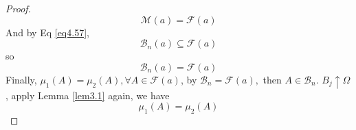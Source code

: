 \begin{proof}
\begin{equation}
   \mathcal{M}\left( a \right) = \mathcal{F}\left( a \right)
   \label{eq4.63}
   \end{equation}
   And by Eq \ref{eq4.57},
   \begin{equation}
   {\mathcal{B}_n}\left( a \right) \subseteq \mathcal{F}\left( a \right)
   \label{eq4.64}
   \end{equation}
   so
   \begin{equation}
   {\mathcal{B}_n}\left( a \right) = \mathcal{F}\left( a \right)
   \label{eq4.65}
   \end{equation}
   Finally, 
   ${\mu _1}\left( A \right) = {\mu _2}\left( A \right),\forall A \in \mathcal{F}\left( a \right)$, by $ {\mathcal{B}_n} =  \mathcal{F}(a),  $  then  $ A \in {\mathcal{B}_n}$. ${B_j} \uparrow \Omega $, apply Lemma \ref{lem3.1} again, we have 
   \begin{equation}
   {\mu _1}\left( A \right) = {\mu _2}\left( A \right)
   \end{equation}
\end{proof}
